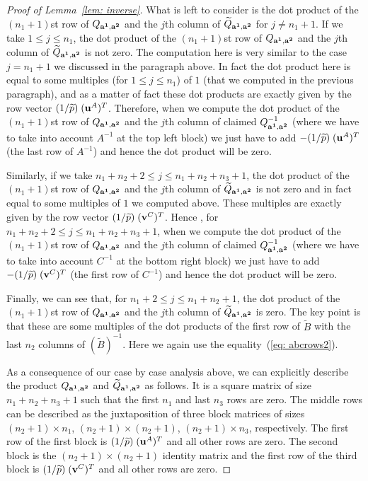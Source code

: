 \documentclass[11pt]{amsart}
\theoremstyle{plain}
\theoremstyle{definition}
\theoremstyle{remark}
\numberwithin{theorem}{section}
\begin{document}
\begin{proof} [Proof of Lemma~\ref{lem: inverse}]
What is left to consider is the dot product of the  $(n_1+1)$st  row of $Q_{{\bf a^1}, {\bf a^2}}$ and the  $j$th column of  $\widetilde{Q}_{{\bf a^1}, {\bf a^2}}$ for  $j \neq n_1+1$. If we take $1 \leq j \leq n_1$, the dot product of the $(n_1+1)$st row of $Q_{{\bf a^1}, {\bf a^2}}$  and the $j$th column of $\widetilde{Q}_{{\bf a^1}, {\bf a^2}}$ is not zero. The computation here is very similar to the case $j=n_1+1$ we discussed in the paragraph above. In fact the dot product here is equal to some multiples (for $1 \leq j \leq n_1$) of $1$ (that we  computed in the previous paragraph), and as a matter of fact  these dot products are exactly given by the row vector $(1/\widetilde{p})\; ({\bf u}^A)^T$. Therefore,  when we compute the dot product  of the $(n_1+1)$st  row of $Q_{{\bf a^1}, {\bf a^2}}$  and 
the $j$th column of claimed $Q_{{\bf a^1}, {\bf a^2}}^{-1}$ (where we have to take into account $A^{-1}$ at the top left block) we just have to add $-(1/\widetilde{p})\; ({\bf u}^A)^T$ (the last row of $A^{-1}$) and hence the dot product will be zero.  

Similarly, if we take $n_1+n_2+2 \leq j \leq n_1+n_2+n_3+1$, the dot product of the $(n_1+1)$st row of $Q_{{\bf a^1}, {\bf a^2}}$  and the $j$th column of $\widetilde{Q}_{{\bf a^1}, {\bf a^2}}$ is not zero and in fact equal to some multiples of $1$ we computed above. These multiples are exactly given by the row vector $(1/\widetilde{p})\; ({\bf v}^C)^T$. Hence ,  for $n_1+n_2+2 \leq j \leq n_1+n_2+n_3+1$, when we compute the dot product  of the $(n_1+1)$st row of $Q_{{\bf a^1}, {\bf a^2}}$  and the $j$th column of claimed $Q_{{\bf a^1}, {\bf a^2}}^{-1}$ (where we have to take into account $C^{-1}$ at the bottom right block) we just have to add $-(1/\widetilde{p})\; ({\bf v}^C)^T$ (the first row of $C^{-1}$) and hence the dot product will be zero.  

Finally, we can see that, for  $n_1+2 \leq j \leq n_1+n_2+1$, the dot product of the $(n_1+1)$st row of $Q_{{\bf a^1}, {\bf a^2}}$  and the $j$th column of $\widetilde{Q}_{{\bf a^1}, {\bf a^2}}$ 
 is zero. The key point is that these are some multiples of  the dot products of the first row of $\widetilde{B}$ with the last $n_2$ columns of $(\widetilde{B})^{-1}$. Here we again use  the equality~(\ref{eq: abcrows2}). 

As a consequence of our case by case analysis  above,  we can explicitly describe the product $Q_{{\bf a^1}, {\bf a^2}}$ and $\widetilde{Q}_{{\bf a^1}, {\bf a^2}}$ as follows. It is a square matrix of size $n_1+n_2+n_3+1$ such that the first $n_1$ and last $n_3$ rows are zero. The middle rows can be described as the juxtaposition of    three block matrices of sizes $(n_2+1) \times n_1$,  $(n_2+1) \times (n_2+1)$, $(n_2+1) \times n_3$, respectively.  The first row of the first block is $(1/\widetilde{p})\; ({\bf u}^A)^T$ and all other rows are zero. The second block is the $(n_2+1) \times (n_2+1)$ identity matrix and the first row of the third block is 
$(1/\widetilde{p})\; ({\bf v}^C)^T$ and all other rows are zero.


\end{proof}
\end{document}
